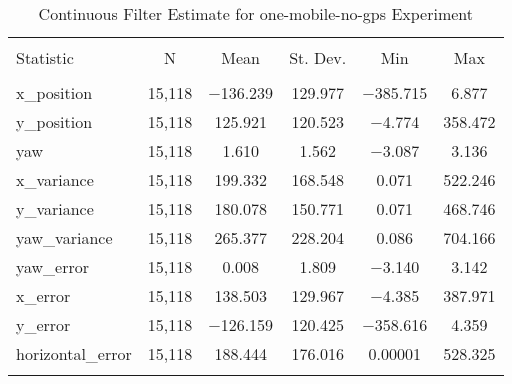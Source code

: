 
\begin{table}[h] \centering 
  \caption{Continuous Filter Estimate for one-mobile-no-gps Experiment} 
  \label{tab:one_mobile_no_gps_continuous_summary} 
\begin{tabular}{@{\extracolsep{5pt}}lccccc} 
\\[-1.8ex]\hline 
\hline \\[-1.8ex] 
Statistic & \multicolumn{1}{c}{N} & \multicolumn{1}{c}{Mean} & \multicolumn{1}{c}{St. Dev.} & \multicolumn{1}{c}{Min} & \multicolumn{1}{c}{Max} \\ 
\hline \\[-1.8ex] 
x\_position & 15,118 & $-$136.239 & \num{129.977} & $-$385.715 & \num{6.877} \\ 
y\_position & 15,118 & \num{125.921} & \num{120.523} & $-$4.774 & \num{358.472} \\ 
yaw & 15,118 & \num{1.610} & \num{1.562} & $-$3.087 & \num{3.136} \\ 
x\_variance & 15,118 & \num{199.332} & \num{168.548} & \num{0.071} & \num{522.246} \\ 
y\_variance & 15,118 & \num{180.078} & \num{150.771} & \num{0.071} & \num{468.746} \\ 
yaw\_variance & 15,118 & \num{265.377} & \num{228.204} & \num{0.086} & \num{704.166} \\ 
yaw\_error & 15,118 & \num{0.008} & \num{1.809} & $-$3.140 & \num{3.142} \\ 
x\_error & 15,118 & \num{138.503} & \num{129.967} & $-$4.385 & \num{387.971} \\ 
y\_error & 15,118 & $-$126.159 & \num{120.425} & $-$358.616 & \num{4.359} \\ 
horizontal\_error & 15,118 & \num{188.444} & \num{176.016} & \num{0.00001} & \num{528.325} \\ 
\hline \\[-1.8ex] 
\end{tabular} 
\end{table} 
